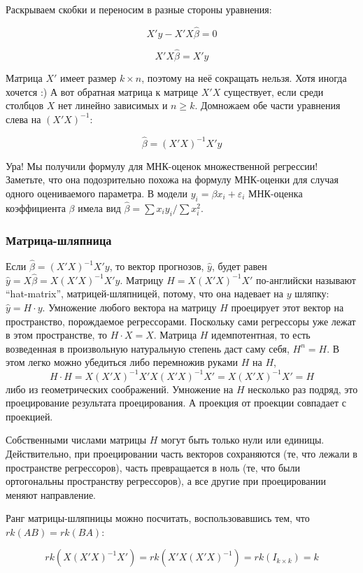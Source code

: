 \documentclass[]{article}
\begin{document}
Раскрываем скобки и переносим в разные стороны уравнения:

\[
X'y-X'X\hat{\beta}=0
\]

\[
X'X\hat{\beta}=X'y
\]

Матрица $X'$ имеет размер $k\times n$, поэтому на неё сокращать нельзя.
Хотя иногда хочется :) А вот обратная матрица к матрице $X'X$
существует, если среди столбцов $X$ нет линейно зависимых и $n\geq k$.
Домножаем обе части уравнения слева на $(X'X)^{-1}$:

\[
\hat{\beta}=(X'X)^{-1}X'y
\]

Ура! Мы получили формулу для МНК-оценок множественной регрессии!
Заметьте, что она подозрительно похожа на формулу МНК-оценки для случая
одного оцениваемого параметра. В модели $y_i=\beta x_i +\varepsilon_i$
МНК-оценка коэффициента $\beta$ имела вид
$\hat{\beta}=\sum x_i y_i /\sum x_i^2$.

\subsubsection{Матрица-шляпница}\label{-}

Если $\hat{\beta}=(X'X)^{-1}X'y$, то вектор прогнозов, $\hat{y}$, будет
равен $\hat{y}=X\hat{\beta}=X(X'X)^{-1}X'y$. Матрицу $H=X(X'X)^{-1}X'$
по-английски называют ``hat-matrix'', матрицей-шляпницей, потому, что
она надевает на $y$ шляпку: $\hat{y}=H\cdot y$. Умножение любого вектора
на матрицу $H$ проецирует этот вектор на пространство, порождаемое
регрессорами. Поскольку сами регрессоры уже лежат в этом пространстве,
то $H\cdot X=X$. Матрица $H$ идемпотентная, то есть возведенная в
произвольную натуральную степень даст саму себя, $H^n=H$. В этом легко
можно убедиться либо перемножив руками $H$ на $H$, \[
H\cdot H=X(X'X)^{-1}X'X(X'X)^{-1}X'=X(X'X)^{-1}X'=H
\] либо из геометрических соображений. Умножение на $H$ несколько раз
подряд, это проецирование результата проецирования. А проекция от
проекции совпадает с проекцией.

Собственными числами матрицы $H$ могут быть только нули или единицы.
Действительно, при проецировании часть векторов сохраняются (те, что
лежали в пространстве регрессоров), часть превращается в ноль (те, что
были ортогональны пространству регрессоров), а все другие при
проецировании меняют направление.

Ранг матрицы-шляпницы можно посчитать, воспользовавшись тем, что
$rk (AB)=rk (BA)$:

\[
rk(X(X'X)^{-1}X')=rk(X'X(X'X)^{-1})=rk(I_{k\times k})=k
\]
\end{document}
